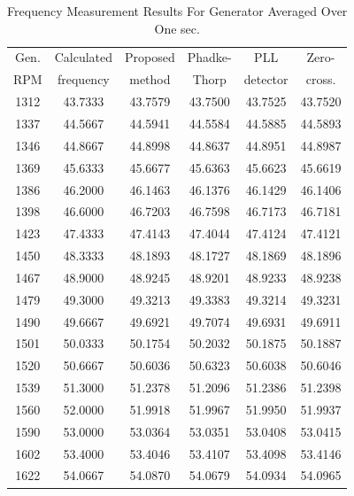 \begin{table}[!t]
\caption{Frequency Measurement Results For Generator Averaged Over One sec.} %
\centering %
\begin{tabular}{c c c c c c} %
\hline\hline                        %
Gen. & Calculated & Proposed & Phadke- & PLL & Zero- \\ %
RPM & frequency & method & Thorp & detector &  cross. \\ [0.5ex]
\hline %
1312 & 43.7333 & 43.7579 & 43.7500 & 43.7525 & 43.7520\\ %
1337 & 44.5667 & 44.5941 & 44.5584 & 44.5885 & 44.5893\\
1346 & 44.8667 & 44.8998 & 44.8637 & 44.8951 & 44.8987\\
1369 & 45.6333 & 45.6677 & 45.6363 & 45.6623 & 45.6619\\
1386 & 46.2000 & 46.1463 & 46.1376 & 46.1429 & 46.1406\\
1398 & 46.6000 & 46.7203 & 46.7598 & 46.7173 & 46.7181\\
1423 & 47.4333 & 47.4143 & 47.4044 & 47.4124 & 47.4121\\
1450 & 48.3333 & 48.1893 & 48.1727 & 48.1869 & 48.1896\\
1467 & 48.9000 & 48.9245 & 48.9201 & 48.9233 & 48.9238\\
1479 & 49.3000 & 49.3213 & 49.3383 & 49.3214 & 49.3231\\
1490 & 49.6667 & 49.6921 & 49.7074 & 49.6931 & 49.6911\\
1501 & 50.0333 & 50.1754 & 50.2032 & 50.1875 & 50.1887\\
1520 & 50.6667 & 50.6036 & 50.6323 & 50.6038 & 50.6046\\
1539 & 51.3000 & 51.2378 & 51.2096 & 51.2386 & 51.2398\\
1560 & 52.0000 & 51.9918 & 51.9967 & 51.9950 & 51.9937\\
1590 & 53.0000 & 53.0364 & 53.0351 & 53.0408 & 53.0415\\
1602 & 53.4000 & 53.4046 & 53.4107 & 53.4098 & 53.4146\\
1622 & 54.0667 & 54.0870 & 54.0679 & 54.0934 & 54.0965\\ [1ex] %
\hline %
\end{tabular}
\label{table_rybfreq} %
\end{table}

